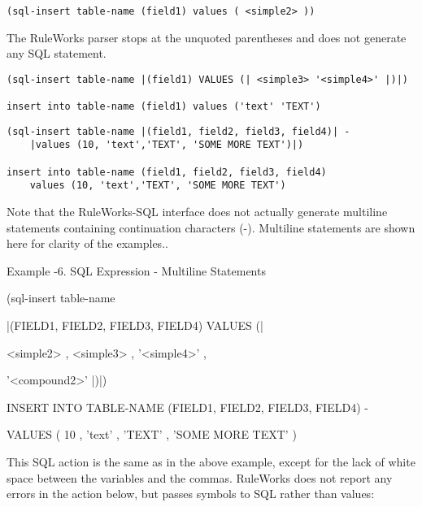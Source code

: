 \begin{exampl}
\begin{verbatim}
(sql-insert table-name (field1) values ( <simple2> ))
\end{verbatim}

  The RuleWorks parser stops at the unquoted parentheses and does not
  generate any SQL statement.
\end{exampl}

\begin{exampl}
\begin{verbatim}
(sql-insert table-name |(field1) VALUES (| <simple3> '<simple4>' |)|)

insert into table-name (field1) values ('text' 'TEXT')
\end{verbatim}
\end{exampl}


\begin{exampl}
\begin{verbatim}
(sql-insert table-name |(field1, field2, field3, field4)| -
    |values (10, 'text','TEXT', 'SOME MORE TEXT')|)

insert into table-name (field1, field2, field3, field4)
    values (10, 'text','TEXT', 'SOME MORE TEXT')
\end{verbatim}
\end{exampl}
      

Note that the RuleWorks-SQL interface does not actually generate
multiline statements containing continuation characters (\co-). Multiline
statements are shown here for clarity of the examples..

Example -6. SQL Expression - Multiline Statements

        (sql-insert table-name

        |(FIELD1, FIELD2, FIELD3, FIELD4) VALUES (|

        <simple2> , <simple3> , '<simple4>' ,

        '<compound2>' |)|)

        INSERT INTO TABLE-NAME (FIELD1, FIELD2,
        FIELD3, FIELD4) -

        VALUES ( 10 , 'text' , 'TEXT' , 'SOME MORE
        TEXT' )

This SQL action is the same as in the above
example, except for the lack of white space between
the variables and the commas. RuleWorks does not
report any errors in the action below, but passes
symbols to SQL rather than values:

